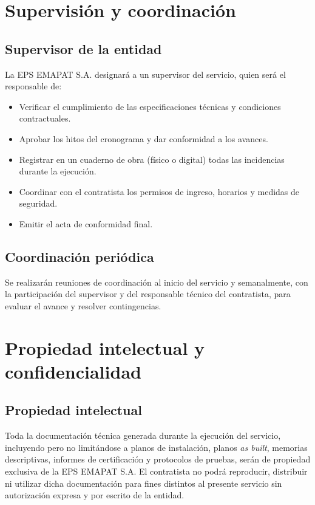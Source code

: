 \documentclass[12pt,a4paper]{article}
\begin{document}
\section{Supervisión y coordinación}

\subsection{Supervisor de la entidad}

La EPS EMAPAT S.A. designará a un supervisor del servicio, quien será el responsable de:
\begin{itemize}
  \item Verificar el cumplimiento de las especificaciones técnicas y condiciones contractuales.
  \item Aprobar los hitos del cronograma y dar conformidad a los avances.
  \item Registrar en un cuaderno de obra (físico o digital) todas las incidencias durante la ejecución.
  \item Coordinar con el contratista los permisos de ingreso, horarios y medidas de seguridad.
  \item Emitir el acta de conformidad final.
\end{itemize}

\subsection{Coordinación periódica}

Se realizarán reuniones de coordinación al inicio del servicio y semanalmente, con la participación del supervisor y del responsable técnico del contratista, para evaluar el avance y resolver contingencias.

\section{Propiedad intelectual y confidencialidad}

\subsection{Propiedad intelectual}

Toda la documentación técnica generada durante la ejecución del servicio, incluyendo pero no limitándose a planos de instalación, planos \emph{as built}, memorias descriptivas, informes de certificación y protocolos de pruebas, serán de propiedad exclusiva de la EPS EMAPAT S.A. El contratista no podrá reproducir, distribuir ni utilizar dicha documentación para fines distintos al presente servicio sin autorización expresa y por escrito de la entidad.
\end{document}
